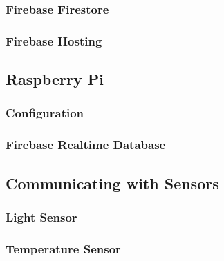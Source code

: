 \documentclass[final]{cmpreport}
\begin{document}
        \subsubsection{Firebase Firestore}
        
        \subsubsection{Firebase Hosting}
        
    
    \subsection{Raspberry Pi}
    
        \subsubsection{Configuration}
    
        \subsubsection{Firebase Realtime Database}
    
    \subsection{Communicating with Sensors}
    
        \subsubsection{Light Sensor}
        
        \subsubsection{Temperature Sensor}
        
\end{document}
